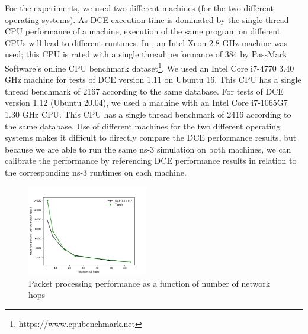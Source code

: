 \documentclass{sig-alternate}
\begin{document}
For the experiments, we used two different machines (for the two different
operating systems).  As DCE execution time is dominated by the single thread
CPU performance of a machine, execution of the same program on different CPUs
will lead to
different runtimes.  In \cite{Tazaki13}, an Intel Xeon 2.8 GHz machine was
used; this CPU is rated with a single thread performance of 384 by PassMark
Software's online CPU benchmark dataset\footnote{https://www.cpubenchmark.net}.
We used an Intel Core i7-4770 3.40 GHz machine for tests of DCE version 1.11
on Ubuntu 16.  This CPU has a single thread benchmark of 2167 according
to the same database.  For tests of DCE version 1.12 (Ubuntu 20.04), we used
a machine with an Intel Core i7-1065G7 1.30 GHz CPU.  This CPU has a
single thread benchmark of 2416 according to the same database.  Use of
different machines for the two different operating systems makes it difficult
to directly compare the DCE performance results, but because we are able to
run the same ns-3 simulation on both machines, we can calibrate the
performance by referencing DCE performance results in relation to the
corresponding ns-3 runtimes on each machine.

\begin{figure}[h!]
  \centering
    \includegraphics[width=0.47\textwidth]{figs/hops-vs-pps.png}
  \caption{Packet processing performance as a function of number of network hops}
  \label{fig:hops-vs-pps}
\end{figure}
\end{document}
